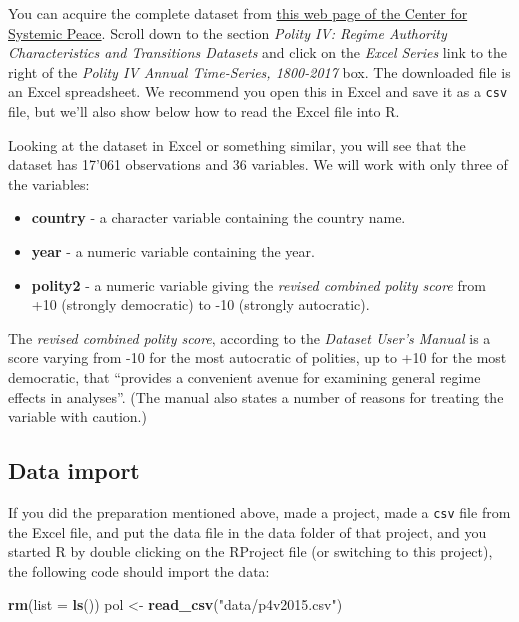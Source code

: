 \documentclass[]{book}
\newenvironment{Shaded}{\begin{snugshade}}{\end{snugshade}}
\newcommand{\DataTypeTok}[1]{\textcolor[rgb]{0.13,0.29,0.53}{#1}}
\newcommand{\KeywordTok}[1]{\textcolor[rgb]{0.13,0.29,0.53}{\textbf{#1}}}
\newcommand{\NormalTok}[1]{#1}
\newcommand{\StringTok}[1]{\textcolor[rgb]{0.31,0.60,0.02}{#1}}
\providecommand{\tightlist}{%
  \setlength{\itemsep}{0pt}\setlength{\parskip}{0pt}}
\begin{document}
You can acquire the complete dataset from \href{http://www.systemicpeace.org/inscrdata.html}{this web page of the Center for Systemic Peace}. Scroll down to the section \emph{Polity IV: Regime Authority Characteristics and Transitions Datasets} and click on the \emph{Excel Series} link to the right of the \emph{Polity IV Annual Time-Series, 1800-2017} box. The downloaded file is an Excel spreadsheet. We recommend you open this in Excel and save it as a \texttt{csv} file, but we'll also show below how to read the Excel file into R.

Looking at the dataset in Excel or something similar, you will see that the dataset has 17'061 observations and 36 variables. We will work with only three of the variables:

\begin{itemize}
\tightlist
\item
  \textbf{country} - a character variable containing the country name.
\item
  \textbf{year} - a numeric variable containing the year.
\item
  \textbf{polity2} - a numeric variable giving the \emph{revised combined polity score} from +10 (strongly democratic) to -10 (strongly autocratic).
\end{itemize}

The \emph{revised combined polity score}, according to the \emph{Dataset User's Manual} is a score varying from -10 for the most autocratic of polities, up to +10 for the most democratic, that ``provides a convenient avenue for examining general regime effects in analyses''. (The manual also states a number of reasons for treating the variable with caution.)

\hypertarget{data-import}{%
\subsection{Data import}\label{data-import}}

If you did the preparation mentioned above, made a project, made a \texttt{csv} file from the Excel file, and put the data file in the data folder of that project, and you started R by double clicking on the RProject file (or switching to this project), the following code should import the data:

\begin{Shaded}
\begin{Highlighting}[]
\KeywordTok{rm}\NormalTok{(}\DataTypeTok{list =} \KeywordTok{ls}\NormalTok{())}
\NormalTok{pol <-}\StringTok{ }\KeywordTok{read_csv}\NormalTok{(}\StringTok{"data/p4v2015.csv"}\NormalTok{)}
\end{Highlighting}
\end{Shaded}
\end{document}
